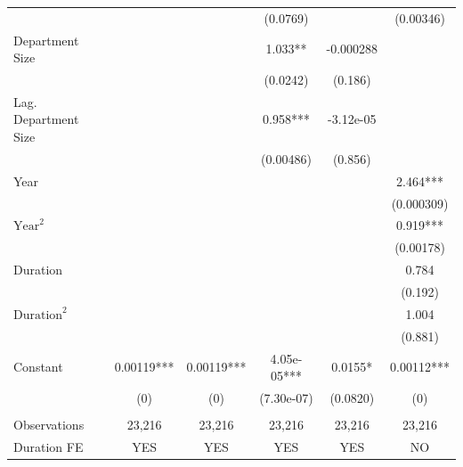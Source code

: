 \documentclass[]{article}
\begin{document}
\begin{table}
\begin{tabular}{lccccc}
                                            &            &            & (0.0769)    &           & (0.00346)  \\
    Department Size                         &            &            & 1.033**     & -0.000288 &            \\
                                            &            &            & (0.0242)    & (0.186)   &            \\
    Lag. Department Size                    &            &            & 0.958***    & -3.12e-05 &            \\
                                            &            &            & (0.00486)   & (0.856)   &            \\
    Year                                    &            &            &             &           & 2.464***   \\
                                            &            &            &             &           & (0.000309) \\
    $\mbox{Year}^2$                         &            &            &             &           & 0.919***   \\
                                            &            &            &             &           & (0.00178)  \\
    Duration                                &            &            &             &           & 0.784      \\
                                            &            &            &             &           & (0.192)    \\
    $\mbox{Duration}^2$                     &            &            &             &           & 1.004      \\
                                            &            &            &             &           & (0.881)    \\
    Constant                                & 0.00119*** & 0.00119*** & 4.05e-05*** & 0.0155*   & 0.00112*** \\
                                            & (0)        & (0)        & (7.30e-07)  & (0.0820)  & (0)        \\
                                            &            &            &             &           &            \\
    Observations                            & 23,216     & 23,216     & 23,216      & 23,216    & 23,216     \\
    Duration FE                             & YES        & YES        & YES         & YES       & NO         \\

\end{tabular}
\end{table}
\end{document}
